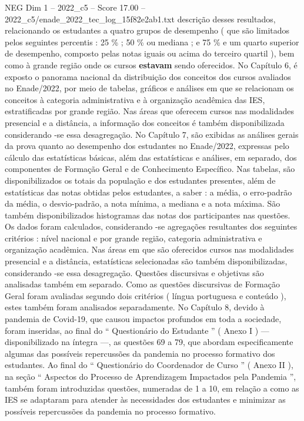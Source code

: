 \begin{textsample}{NEG Dim 1 – 2022\_c5 – Score 17.00 – 2022\_c5/enade\_2022\_tec\_log\_15f82e2ab1.txt}  \label{ex:f1_neg_416}
descrição desses resultados, relacionando os estudantes a quatro grupos de desempenho ( que são limitados pelos seguintes percentis : 25 \% ; 50 \% ou mediana ; e 75 \% e um quarto superior de desempenho, composto pelas notas iguais ou acima do terceiro quartil ), bem como à grande região onde os cursos \textbf{estavam} sendo oferecidos.
No Capítulo 6, é exposto o panorama nacional da distribuição dos conceitos dos cursos avaliados no Enade/2022, por meio de tabelas, gráficos e análises em que se relacionam os conceitos à categoria administrativa e à organização acadêmica das IES, estratificadas por grande região.
Nas áreas que oferecem cursos nas modalidades presencial e a distância, a informação dos conceitos é também disponibilizada considerando -se essa desagregação.
No Capítulo 7, são exibidas as análises gerais da prova quanto ao desempenho dos estudantes no Enade/2022, expressas pelo cálculo das estatísticas básicas, além das estatísticas e análises, em separado, dos componentes de Formação Geral e de Conhecimento Específico.
Nas tabelas, são disponibilizados os totais da população e dos estudantes presentes, além de estatísticas das notas obtidas pelos estudantes, a saber : a média, o erro-padrão da média, o desvio-padrão, a nota mínima, a mediana e a nota máxima.
São também disponibilizados histogramas das notas dos participantes nas questões.
Os dados foram calculados, considerando -se agregações resultantes dos seguintes critérios : nível nacional e por grande região, categoria administrativa e organização acadêmica.
Nas áreas em que são oferecidos cursos nas modalidades presencial e a distância, estatísticas selecionadas são também disponibilizadas, considerando -se essa desagregação.
Questões discursivas e objetivas são analisadas também em separado.
Como as questões discursivas de Formação Geral foram avaliadas segundo dois critérios ( língua portuguesa e conteúdo ), estes também foram analisados separadamente.
No Capítulo 8, devido à pandemia de Covid-19, que causou impactos profundos em toda a sociedade, foram inseridas, ao final do “ Questionário do Estudante ” ( Anexo I ) — disponibilizado na íntegra —, as questões 69 a 79, que abordam especificamente algumas das possíveis repercussões da pandemia no processo formativo dos estudantes.
Ao final do “ Questionário do Coordenador de Curso ” ( Anexo II ), na seção “ Aspectos do Processo de Aprendizagem Impactados pela Pandemia ”, também foram introduzidas questões, numeradas de 1 a 10, em relação a como as IES se adaptaram para atender às necessidades dos estudantes e minimizar as possíveis repercussões da pandemia no processo formativo.

\end{textsample}
